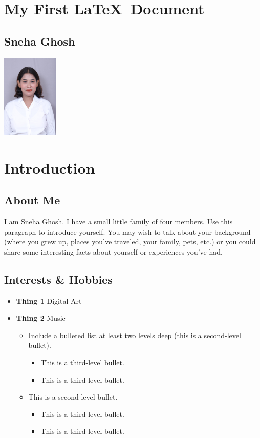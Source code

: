\documentclass[a4paper,14pt]{article}
\begin{document}
\author{}

\maketitle

\section{My First \LaTeX\ Document}
\subsection{Sneha Ghosh}

\begin{center}
    \includegraphics[width=0.2\textwidth]{Sneha.jpg}
\end{center}
\section{Introduction}
\subsection{About Me}
I am Sneha Ghosh. I have a small little family of four members. Use this paragraph to introduce yourself. You may wish to talk about your background (where you grew up, places you’ve traveled, your family, pets, etc.) or you could share some interesting facts about yourself or experiences you’ve had.
\subsection{Interests \& Hobbies}
\begin{itemize}
    \item \textbf{Thing 1} Digital Art
    \item \textbf{Thing 2} Music
    \begin{itemize}
        \item Include a bulleted list at least two levels deep (this is a second-level bullet).
        \begin{itemize}
            \item This is a third-level bullet.
            \item This is a third-level bullet.
        \end{itemize}
        \item This is a second-level bullet.
        \begin{itemize}
            \item This is a third-level bullet.
            \item This is a third-level bullet.
        \end{itemize}
    \end{itemize}
\end{itemize}
\end{document}
